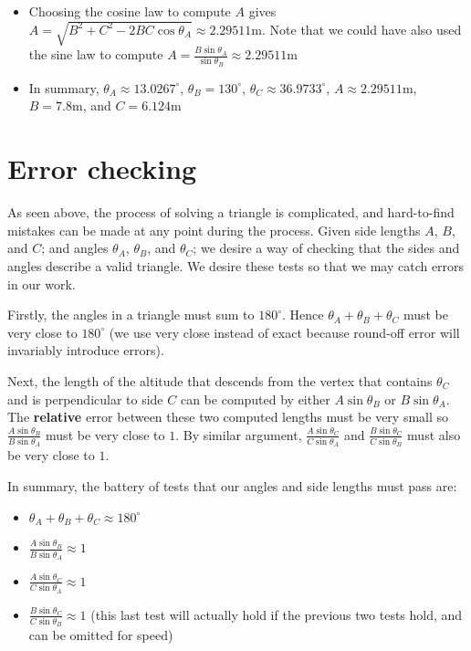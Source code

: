 \documentclass{article}
\begin{document}
\begin{itemize}
\begin{itemize}
	\item[\textasteriskcentered] Choosing the cosine law to compute \(A\) gives \(A = \sqrt{B^2 + C^2 - 2BC\cos\theta_A} \approx 2.29511\text{m}\). Note that we could have also used the sine law to compute \(A = \frac{B\sin\theta_A}{\sin\theta_B} \approx 2.29511\text{m}\)
	\item[\textasteriskcentered] In summary, \(\theta_A \approx 13.0267^\circ\), \(\theta_B = 130^\circ\), \(\theta_C \approx 36.9733^\circ\), \(A \approx 2.29511\text{m}\), \(B = 7.8\text{m}\), and \(C = 6.124\text{m}\)
	\end{itemize}
\end{itemize}




\section*{Error checking}

As seen above, the process of solving a triangle is complicated, and hard-to-find mistakes can be made at any point during the process. Given side lengths \(A\), \(B\), and \(C\); and angles \(\theta_A\), \(\theta_B\), and \(\theta_C\); we desire a way of checking that the sides and angles describe a valid triangle. We desire these tests so that we may catch errors in our work. 

Firstly, the angles in a triangle must sum to \(180^\circ\). Hence \(\theta_A + \theta_B + \theta_C\) must be very close to \(180^\circ\) (we use very close instead of exact because round-off error will invariably introduce errors). 

Next, the length of the altitude that descends from the vertex that contains \(\theta_C\) and is perpendicular to side \(C\) can be computed by either \(A\sin\theta_B\) or \(B\sin\theta_A\). The {\bf relative} error between these two computed lengths must be very small so \(\frac{A\sin\theta_B}{B\sin\theta_A}\) must be very close to \(1\). By similar argument, \(\frac{A\sin\theta_C}{C\sin\theta_A}\) and \(\frac{B\sin\theta_C}{C\sin\theta_B}\) must also be very close to \(1\). 

In summary, the battery of tests that our angles and side lengths must pass are:
\begin{itemize}
\item \(\theta_A + \theta_B + \theta_C \approx 180^\circ\)
\item \(\frac{A\sin\theta_B}{B\sin\theta_A} \approx 1\)
\item \(\frac{A\sin\theta_C}{C\sin\theta_A} \approx 1\)
\item \(\frac{B\sin\theta_C}{C\sin\theta_B} \approx 1\) (this last test will actually hold if the previous two tests hold, and can be omitted for speed)
\end{itemize} 
\end{document}
